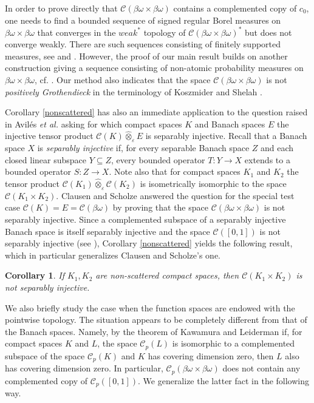 \documentclass[12pt,fleqn]{amsart}
\numberwithin{equation}{section}
\newtheorem{cor}[thm]{Corollary}
\theoremstyle{definition}
\def\C{\mathcal C}
\newcommand{\bobo}{\beta\omega\times\beta\omega}
\newcommand{\con}{\mathfrak c}
\newcommand{\eps}{\varepsilon}
\begin{document}

In order to prove directly that $\C(\bobo)$ contains a complemented copy of $c_0$, one needs to find a bounded sequence
of signed regular Borel measures on $\bobo$ that converges in the $weak^\ast$ topology of $\C(\bobo)^\ast$ but does not converge
weakly. There are such sequences consisting of finitely supported measures, see \cite{KMSZ} and \cite{KSZ}.
However, the proof of our main result builds on another construction giving a sequence consisting of non-atomic 
probability measures on $\bobo$, cf. \cite[Theorem 9.1]{Pl23}. Our method also indicates
that the space $\C(\bobo)$ is not \emph{positively Grothendieck} in the terminology
of Koszmider and Shelah \cite{KS13}.

Corollary \ref{nonscattered} has also an immediate application to the question raised in Avil\'es \textit{et al.} \cite[Section 6.4.1]{Spaniards} asking for which compact spaces $K$ and Banach spaces $E$ the injective tensor product $\C(K)\hat{\otimes}_\eps E$ is separably injective. Recall that a Banach space $X$ is \emph{separably injective} if, for every separable Banach space $Z$ and each closed linear subspace $Y\subseteq Z$, every bounded operator $T\colon Y\to X$ extends to a bounded operator $S\colon Z\to X$. Note also that for compact spaces $K_1$ and $K_2$ the tensor product $\C(K_1)\hat{\otimes}_\eps\C(K_2)$ is isometrically isomorphic to the space $\C(K_1\times K_2)$. Clausen and Scholze \cite[Theorem 3.19]{CS22} answered the question for the special test case $\C(K)=E=\C(\beta\omega)$ by proving that the space $\C(\bobo)$ is not separably injective. Since a complemented subspace of a separably injective Banach space is itself separably injective and the space $\C([0,1])$ is not separably injective (see \cite[Chapter 2]{Spaniards}), Corollary \ref{nonscattered} yields the following result, which in particular generalizes Clausen and Scholze's one.

\begin{cor}\label{sepinj}
If $K_1, K_2$ are non-scattered compact spaces, then $\C(K_1\times K_2)$ is not separably injective.
\end{cor} 

We also briefly study the case when the function spaces are endowed with the pointwise topology. The situation appears to be completely different from that of the Banach spaces. Namely, by the theorem of Kawamura and Leiderman \cite{KL17} if, for compact spaces $K$ and $L$, the space $\C_p(L)$ is isomorphic to a complemented subspace of the space $\C_p(K)$ and $K$ has covering dimension zero, then $L$ also has covering dimension zero. In particular, $\C_p(\bobo)$ does not contain any complemented copy of $\C_p([0,1])$. We generalize the latter fact in the following way.
\end{document}
